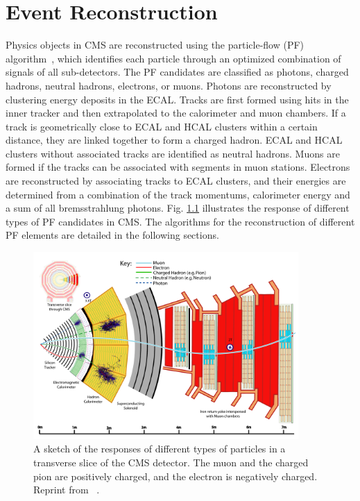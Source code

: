 \documentclass[thesis.tex]{subfiles}
\begin{document}
\chapter{Event Reconstruction}

Physics objects in CMS are reconstructed using the particle-flow (PF) algorithm~\cite{PARTICLEFLOW}, which identifies each particle through an optimized combination of signals of all sub-detectors.
The PF candidates are classified as photons, charged hadrons, neutral hadrons, electrons, or muons.
Photons are reconstructed by clustering energy deposits in the ECAL. 
Tracks are first formed using hits in the inner tracker and then extrapolated to the calorimeter and muon chambers.
If a track is geometrically close to ECAL and HCAL clusters within a certain distance, they are linked together to form a charged hadron.  
ECAL and HCAL clusters without associated tracks are identified as neutral hadrons. 
Muons are formed if the tracks can be associated with segments in muon stations. 
Electrons are reconstructed by associating tracks to ECAL clusters, and their energies are determined from a combination of the track momentums, calorimeter energy and a sum of all bremsstrahlung photons. 
Fig. \ref{fig:PF} illustrates the response of different types of PF candidates in CMS. 
The algorithms for the reconstruction of different PF elements are detailed in the following sections. 

\begin{figure}[h]
	\includegraphics[width=0.9\textwidth]{Fig/ParticleFlow.pdf}
	\caption{A sketch of the responses of different types of particles in a transverse slice of the CMS detector. The muon and the charged pion are positively charged, and the electron is negatively charged. Reprint from ~\cite{PARTICLEFLOW}. }
	\label{fig:PF}
\end{figure}
\end{document}
